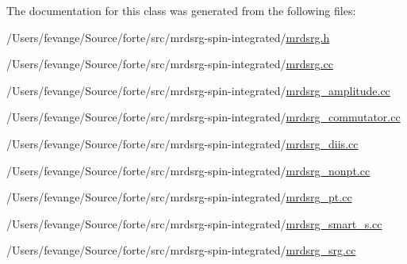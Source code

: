 The documentation for this class was generated from the following files\+:\begin{DoxyCompactItemize}
\item 
/\+Users/fevange/\+Source/forte/src/mrdsrg-\/spin-\/integrated/\mbox{\hyperlink{mrdsrg_8h}{mrdsrg.\+h}}\item 
/\+Users/fevange/\+Source/forte/src/mrdsrg-\/spin-\/integrated/\mbox{\hyperlink{mrdsrg_8cc}{mrdsrg.\+cc}}\item 
/\+Users/fevange/\+Source/forte/src/mrdsrg-\/spin-\/integrated/\mbox{\hyperlink{mrdsrg__amplitude_8cc}{mrdsrg\+\_\+amplitude.\+cc}}\item 
/\+Users/fevange/\+Source/forte/src/mrdsrg-\/spin-\/integrated/\mbox{\hyperlink{mrdsrg__commutator_8cc}{mrdsrg\+\_\+commutator.\+cc}}\item 
/\+Users/fevange/\+Source/forte/src/mrdsrg-\/spin-\/integrated/\mbox{\hyperlink{mrdsrg__diis_8cc}{mrdsrg\+\_\+diis.\+cc}}\item 
/\+Users/fevange/\+Source/forte/src/mrdsrg-\/spin-\/integrated/\mbox{\hyperlink{mrdsrg__nonpt_8cc}{mrdsrg\+\_\+nonpt.\+cc}}\item 
/\+Users/fevange/\+Source/forte/src/mrdsrg-\/spin-\/integrated/\mbox{\hyperlink{mrdsrg__pt_8cc}{mrdsrg\+\_\+pt.\+cc}}\item 
/\+Users/fevange/\+Source/forte/src/mrdsrg-\/spin-\/integrated/\mbox{\hyperlink{mrdsrg__smart__s_8cc}{mrdsrg\+\_\+smart\+\_\+s.\+cc}}\item 
/\+Users/fevange/\+Source/forte/src/mrdsrg-\/spin-\/integrated/\mbox{\hyperlink{mrdsrg__srg_8cc}{mrdsrg\+\_\+srg.\+cc}}\end{DoxyCompactItemize}
